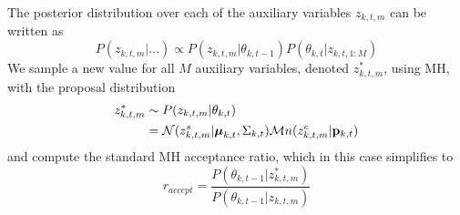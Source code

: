 \documentclass{article}
\newcommand{\willie}[1]{\textcolor{green}{\textsf{\emph{\textbf{\textcolor{green}{#1}}}}}}
\begin{document}
The posterior distribution over each of the auxiliary variables $z_{k,t,m}$ can be written as
\begin{equation}
\label{stationary_pdf}
P(z_{k,t,m} | \ldots) \propto  P(z_{k,t,m} | \theta_{k,t-1}) P(\theta_{k,t} | z_{k,t,1:M})
\end{equation}
%
%
%
%
We sample a new value for all $M$ auxiliary variables, denoted $z_{k,t,m}^{*}$, using MH, with the proposal distribution
\begin{align}
\begin{split}
\label{proposal_distro}
z_{k,t,m}^{*}  &\sim  P(z_{k,t,m} | \theta_{k,t}) \\
&= \mathcal{N}(z_{k,t,m}^{s} | \boldsymbol{\mu}_{k,t}, \Sigma_{k,t}) \mathcal{M}n(z_{k,t,m}^{c} | \bold{p}_{k,t})
\end{split}
\end{align}
and compute the standard MH acceptance ratio, which in this case simplifies to 
\begin{equation}
\label{accept_ratio}
r_{accept} = \frac{P(\theta_{k,t-1} | z_{k,t,m}^{*})}{P(\theta_{k,t-1} | z_{k,t,m})}
\end{equation}
\end{document}
